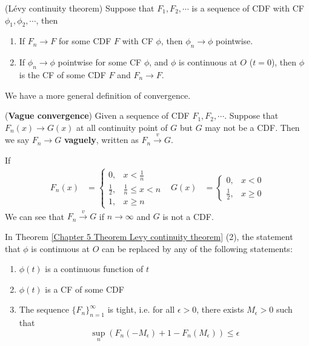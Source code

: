 \documentclass{huhtakm-template-book}
\begin{document}
\begin{thm}(L\'evy continuity theorem)
    \label{Chapter 5 Theorem Levy continuity theorem}
    Suppose that $F_{1},F_{2},\cdots$ is a sequence of CDF with CF $\phi_{1},\phi_{2},\cdots$, then
    \begin{enumerate}
        \item If $F_{n}\to F$ for some CDF $F$ with CF $\phi$, then $\phi_{n}\to\phi$ pointwise.
        \item If $\phi_{n}\to\phi$ pointwise for some CF $\phi$, and $\phi$ is continuous at $O$ ($t=0$), then $\phi$ is the CF of some CDF $F$ and $F_{n}\to F$.
    \end{enumerate}
\end{thm}
We have a more general definition of convergence.
\begin{defn}(\textbf{Vague convergence})
    Given a sequence of CDF $F_{1},F_{2},\cdots$. Suppose that $F_{n}(x)\to G(x)$ at all continuity point of $G$ but $G$ may not be a CDF. Then we say $F_{n}\to G$ \textbf{vaguely}, written as $F_{n}\xrightarrow{v}G$.
\end{defn}
\begin{eg}
If
    \begin{align*}
        F_{n}(x)&=\begin{cases}
            0, &x<\frac{1}{n}\\
            \frac{1}{2}, &\frac{1}{n}\leq x<n\\
            1, &x\geq n
        \end{cases} & G(x)&=\begin{cases}
            0, &x<0\\
            \frac{1}{2}, &x\geq 0
        \end{cases}
    \end{align*}
    We can see that $F_{n}\xrightarrow{v}G$ if $n\to\infty$ and $G$ is not a CDF.
\end{eg}
\begin{rem}
    In Theorem \ref{Chapter 5 Theorem Levy continuity theorem} (2), the statement that $\phi$ is continuous at $O$ can be replaced by any of the following statements:
    \begin{enumerate}
        \item $\phi(t)$ is a continuous function of $t$
        \item $\phi(t)$ is a CF of some CDF
        \item The sequence $\{F_{n}\}_{n=1}^{\infty}$ is tight, i.e. for all $\epsilon>0$, there exists $M_{\epsilon}>0$ such that
        \begin{equation*}
            \sup_{n}(F_{n}(-M_{\epsilon})+1-F_{n}(M_{\epsilon}))\leq\epsilon
        \end{equation*}
    \end{enumerate}
\end{rem}
\end{document}
